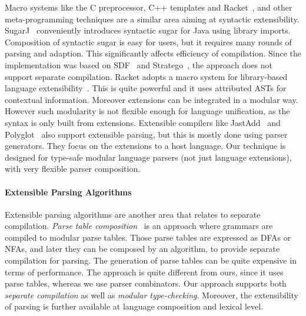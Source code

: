 Macro systems like the C preprocessor, C++ templates and
Racket~\cite{Tobin-Hochstadt2011}, and other meta-programming
techniques are a similar area aiming at syntactic extensibility.
SugarJ~\cite{Erdweg2011} conveniently introduces syntactic sugar for
Java using library imports. Composition of syntactic sugar is easy for
users, but it requires many rounds of parsing and adaption. This
significantly affects efficiency of compilation. Since the
implementation was based on SDF~\cite{Heering1989} and
Stratego~\cite{Visser2001}, the approach does not support separate
compilation. Racket adopts a macro system for library-based language
extensibility~\cite{Tobin-Hochstadt2011}. This is quite powerful and it uses
attributed ASTs for contextual
information. Moreover extensions can be integrated in a modular
way. However such modularity is not flexible enough for language
unification, as the syntax is only built from extensions.
Extensible
compilers like JastAdd~\cite{Ekman2007} and
Polyglot~\cite{Nystrom2003} also support extensible parsing, but this
is mostly done using parser generators. They focus on the
extensions to a host language. Our technique is designed for type-safe
modular language parsers (not just language
extensions), with very flexible parser composition.


\paragraph{Extensible Parsing Algorithms}
Extensible parsing algorithms are another area that relates to
separate compilation.
\textit{Parse table composition}~\cite{Bravenboer2009}
is an approach where grammars are compiled to
modular parse tables. Those parse tables are expressed as DFAs
or NFAs, and later they can be composed by an algorithm, to provide
separate compilation for parsing. The generation of parse tables can
be quite expensive in terms of performance. The approach
is quite different from ours, since it uses parse
 tables, whereas we use parser combinators.
Our approach supports both
\emph{separate compilation} as well as \emph{modular
  type-checking}. Moreover, the extensibility of parsing is further
available at language composition and lexical level.

